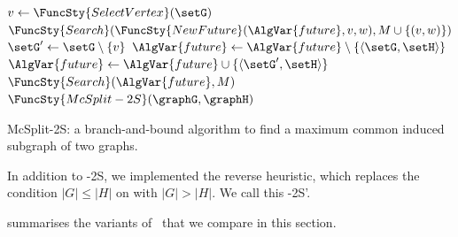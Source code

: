 \begin{algorithm}[h!]
{\nl \If{$|\setG| \leq |\setH|$ \label{ChooseBranchingSideMS2}} {
\nl   {} \;
\nl   $v \gets \FuncSty{SelectVertex}(\setG)$ \label{SelectVertexMS2} \;
\nl   {} {
\nl     $\FuncSty{Search}(\FuncSty{NewFuture}(\AlgVar{future}, v, w),M\cup \{(v,w)\})$ \label{ExpandWithVMS2} \;
  }
\nl   $\setG' \gets \setG \setminus \{v\}$ \label{RemoveVMS2} \;
\nl   $\AlgVar{future} \gets \AlgVar{future} \setminus \{\langle \setG,\setH \rangle\}$\;
\nl   {} {$\AlgVar{future} \gets \AlgVar{future} \cup \{\langle \setG',\setH \rangle \}$}
      } \nl {}
\nl $\FuncSty{Search}(\AlgVar{future},M)$ \label{ExpandWithoutVMS2} \;
}
\;
\nl $\FuncSty{McSplit-2S}(\graphG,\graphH)$ \label{McSplitFunMS2} \;
\nl {}
\caption{McSplit-2S: a branch-and-bound algorithm to find a maximum common induced subgraph of two graphs.}
\label{McSplit-2SAlg}
\end{algorithm}

In addition to \McSplit-2S, we implemented the reverse heuristic, which replaces the condition
$|G| \leq |H|$ on  with $|G| > |H|$.  We call this \McSplit-2S'.

 summarises the variants of \McSplit\ that we compare in this section.

\FloatBarrier

